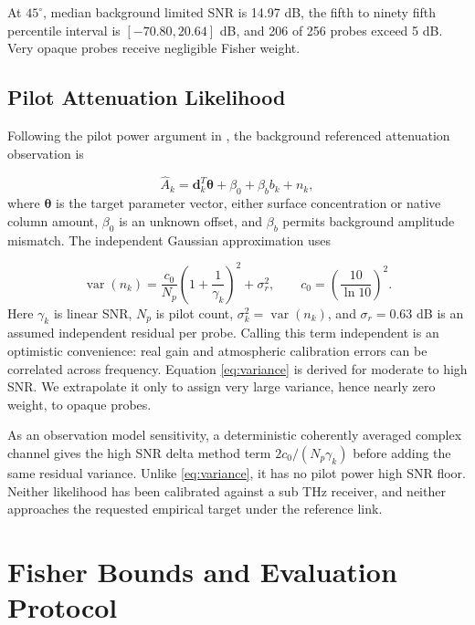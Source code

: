 \documentclass[conference]{IEEEtran}
\begin{document}
At $45^\circ$, median background limited SNR is 14.97 dB, the fifth to ninety fifth percentile interval is $[-70.80,20.64]$ dB, and 206 of 256 probes exceed 5 dB. Very opaque probes receive negligible Fisher weight.

\subsection{Pilot Attenuation Likelihood}

Following the pilot power argument in \cite{dong2026rain}, the background referenced attenuation observation is

\begin{equation}
\widehat{A}_k=\boldsymbol d_k^T\boldsymbol\theta
+\beta_0+\beta_b b_k+n_k,
\label{eq:observation}
\end{equation}
where $\boldsymbol\theta$ is the target parameter vector, either surface concentration or native column amount, $\beta_0$ is an unknown offset, and $\beta_b$ permits background amplitude mismatch. The independent Gaussian approximation uses

\begin{equation}
\operatorname{var}(n_k)=\frac{c_0}{N_p}
\left(1+\frac{1}{\gamma_k}\right)^2+\sigma_r^2,
\qquad c_0=\left(\frac{10}{\ln 10}\right)^2.
\label{eq:variance}
\end{equation}
Here $\gamma_k$ is linear SNR, $N_p$ is pilot count, $\sigma_k^2=\operatorname{var}(n_k)$, and $\sigma_r=0.63$ dB is an assumed independent residual per probe. Calling this term independent is an optimistic convenience: real gain and atmospheric calibration errors can be correlated across frequency. Equation \eqref{eq:variance} is derived for moderate to high SNR. We extrapolate it only to assign very large variance, hence nearly zero weight, to opaque probes.

As an observation model sensitivity, a deterministic coherently averaged complex channel gives the high SNR delta method term $2c_0/(N_p\gamma_k)$ before adding the same residual variance. Unlike \eqref{eq:variance}, it has no pilot power high SNR floor. Neither likelihood has been calibrated against a sub THz receiver, and neither approaches the requested empirical target under the reference link.

\section{Fisher Bounds and Evaluation Protocol}
\end{document}
